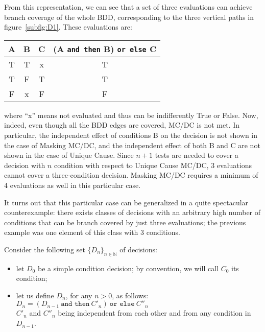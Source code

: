 \documentclass[a4paper,12pt,twoside]{article}
\newcommand{\N}{\mathbb{N}}
\newcommand{\andthen}{\texttt{and then}}
\newcommand{\orelse}{\texttt{or else}}
\begin{document}
From this representation, we can see that a set of three evaluations can
achieve branch coverage of the whole BDD, corresponding to the three vertical
paths in figure~\ref{subfig:D1}.
%
These evaluations are:

\begin{center}
\begin{tabular}{|c|c|c||c|}
\hline
A & B & C & (A \andthen{} B) \orelse{} C \\ \hline
T & T & x & T \\ \hline
T & F & T & T \\ \hline
F & x & F & F \\ \hline
\end{tabular}
\end{center}

where ``x'' means not evaluated and thus can be indifferently True or False.
%
Now, indeed, even though all the BDD edges are covered, MC/DC is not
met. In particular, the independent effect of conditions B on the
decision is not shown in the case of Masking MC/DC, and the
independent effect of both B and C are not shown in the case of Unique
Cause.  Since $n+1$ tests are needed to cover a decision with $n$
condition with respect to Unique Cause MC/DC, 3 evaluations cannot cover a
three-condition decision. Masking MC/DC requires a minimum of 4 evaluations
as well in this particular case.

It turns out that this particular case can be generalized in a
quite spectacular counterexample: there exists classes of decisions
with an arbitrary high number of conditions that can be branch covered
by just three evaluations; the previous example was one element of this
class with 3 conditions.

Consider the following set $\{D_{n}\}_{n \in \N}$  of decisions:

\begin{itemize}
\item let $D_{0}$ be a simple condition decision; by convention,
      we will call $C_{0}$ its condition;
\item let us define $D_{n}$, for any $n>0$, as follows:\\
      $D_{n} = (D_{n-1} \ \andthen{} \ C'_{n}) \ \orelse{} \ C''_{n}$\\
      $C'_{n}$ and $C''_{n}$ being independent from each other and from
      any condition in $D_{n-1}$.
\end{itemize}
\end{document}
